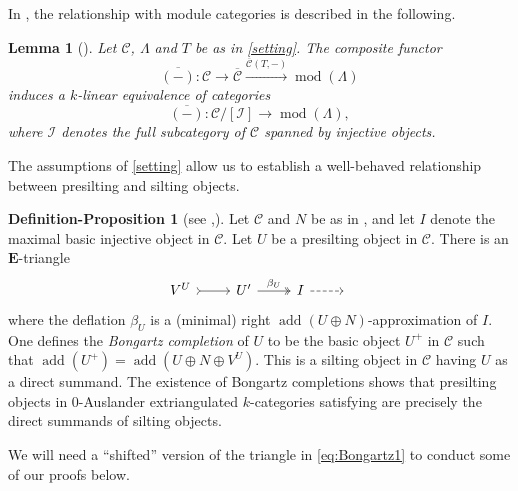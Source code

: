 \documentclass[10pt,twoside, a4paper,reqno]{amsart}
\DeclareMathOperator{\mods}{mod}
\DeclareMathOperator{\add}{add}
\newcommand{\calC}{\mathcal{C}}
\newcommand{\E}{\mathbf{E}}
\newtheorem{lemma}[theorem]{Lemma}
\theoremstyle{definition}
\newtheorem{definitionproposition}[theorem]{Definition-Proposition}
\begin{document}
In , the relationship with module categories is described in the following.

\begin{lemma}[{\cite[{Prop.} 3.11]{GNP23}}]\label{lem:GNP23.3.11}
   Let $\calC$, $\Lambda$ and $T$ be as in \cref{setting}.
    The composite functor
    \begin{equation*}
       \overline{(-)}\colon \calC \to \overline{\calC} \xrightarrow{\overline{\calC}(T,-)} \mods(\Lambda)
    \end{equation*}
    induces a $k$-linear equivalence of categories
    \begin{equation}\label{eq:GNP23.3.11}
      \overline{(-)}\colon \calC/[\mathcal{I}] \to \mods(\Lambda),
    \end{equation}
    where $\mathcal{I}$ denotes the full subcategory of $\calC$ spanned by injective objects. 
\end{lemma}

The assumptions of \cref{setting} allow us to establish a well-behaved relationship between presilting and silting objects.

\begin{definitionproposition}[{see \cite[Corollary 4.8]{GNP23},\cite[{Lem.} 4.2]{IJY14}}]\label{defprop:Bongartz} 
    Let $\calC$ and $N$ be as in , and let $I$ denote the maximal basic injective object in $\calC$. Let $U$ be a presilting object in $\calC$. There is an $\E$-triangle 
    \begin{equation}\label{eq:Bongartz1}
    \begin{tikzcd}
	V^U \arrow[r ,tail] & U' \arrow[r,"\beta_U",two heads] &I \arrow[r,dashed] & {}
    \end{tikzcd}
    \end{equation}
    where the deflation $\beta_U$ is a (minimal) right $\add(U\oplus N)$-approximation of $I$. One defines the \textit{Bongartz completion} of $U$ to be the basic object $U^+$ in $\calC$ such that $ \add(U^+)= \add(U \oplus N \oplus V^U)$. This is a silting object in $\calC$ having $U$ as a direct summand. The existence of Bongartz completions shows that presilting objects in 0-Auslander extriangulated $k$-{categories} satisfying  are precisely the direct summands of silting objects. 
\end{definitionproposition}

We will need a ``shifted'' version of the triangle in \eqref{eq:Bongartz1} to conduct some of our proofs below.
\end{document}

